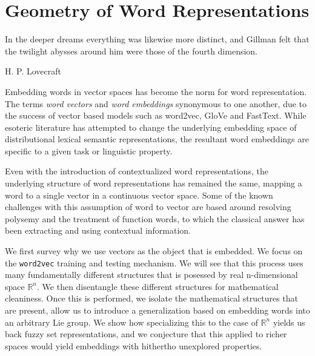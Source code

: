 \documentclass[11pt]{book}
\newcommand{\R}{\ensuremath{\mathbb R}}
\begin{document}
\chapter{Geometry of Word Representations}
\label{chapter:geometrization}

\epigraph{In the deeper dreams everything was likewise more distinct, and Gillman
felt that the twilight abysses around him were those of the fourth dimension.}{H. P. Lovecraft}


Embedding words in vector spaces has become the norm for word representation.
The terms \emph{word vectors} and \emph{word embeddings} synonymous to one
another, due to the success of vector based models such as word2vec, GloVe and
FastText.  While esoteric literature has attempted to change the underlying
embedding space of distributional lexical semantic representations, the
resultant word embeddings are specific to a given task or linguistic property.

Even with the introduction of contextualized word representations, the
underlying structure of word representations has remained the same, mapping a
word to a single vector in a continuous vector space. Some of the known
challenges with this assumption of word to vector are based around
resolving polysemy and the treatment of function words, to which the classical
answer has been extracting and using contextual information.

We first survey why we use vectors as the object that is embedded. We focus
on the \texttt{word2vec} training and testing mechanism. We will see that this process
uses many fundamentally different structures that is posessed by real n-dimensional space $\R^n$.
We then disentangle these different structures for mathematical cleaniness. Once this is performed,
we isolate the mathematical structures that are present, allow us to introduce a 
generalization based on embedding words into an arbitrary Lie group. We show how
specializing this to the case of $\R^n$ yields us back fuzzy set representations, and we
conjecture that this applied to richer spaces would yield embeddings with 
hithertho unexplored properties.
\end{document}
